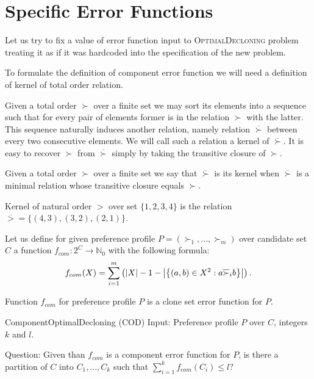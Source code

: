 \section{Specific Error Functions}

Let us try to fix a value of error function input to \textsc{OptimalDecloning} problem
treating it as if it was hardcoded into the specification of the new problem.



To formulate the definition of component error function we will need a definition of kernel of total order relation.

Given a total order $\succ$ over a finite set we may sort its elements into a sequence
such that for every pair of elements former is in the relation $\succ$ with the latter.
This sequence naturally induces another relation, namely relation $\overline{\succ}$
between every two consecutive elements.
We will call such a relation a kernel of $\overline{\succ}$.
It is easy to recover $\succ$ from $\overline{\succ}$ simply by taking the transitive closure of $\succ$.

\begin{defn}
Given a total order $\succ$ over a finite set we say that $\overline{\succ}$ is its kernel when
$\overline{\succ}$ is a minimal relation whose transitive closure equals $\succ$.
\end{defn}

\begin{exmp}
Kernel of natural order $>$ over set $\{1,2,3,4\}$ is the relation
$\overline{>} = \{(4,3), (3,2), (2,1)\}$.
\end{exmp}

\begin{defn}
Let us define for given preference profile $P = (\succ_1, ..., \succ_m)$ over candidate set $C$
a function $f_{com}: 2^C \rightarrow \mathbb{N}_0$ with the following formula:
$$ f_{com}(X) = \sum_{i=1}^m \left( \left\vert X \right\vert-1 -
\left\vert \left\lbrace \left( a,b \right) \in X^2 : a \overline{\succ}_i b \right\rbrace  \right\vert
\right) \text{.}$$
\end{defn}

\begin{rmrk}
Function $f_{com}$ for preference profile $P$ is a clone set error function for $P$.
\end{rmrk}

\begin{problem}{ComponentOptimalDecloning (COD)}
	Input: Preference profile $P$ over $C$, integers $k$ and $l$.

	Question: Given than $f_{com}$ is a component error function for $P$,
		is there a partition of $C$ into $C_1, ..., C_k$ such that $\sum_{i=1}^k f_{com}(C_i) \leq l$?
\end{problem}


